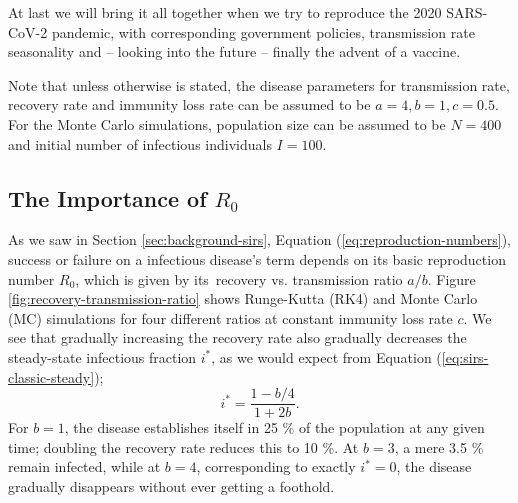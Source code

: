 \documentclass[]{article}
\begin{document}
At last we will bring it all together when we try to reproduce the 2020 SARS-CoV-2 pandemic, with corresponding government policies, transmission rate seasonality and -- looking into the future -- finally the advent of a vaccine.

Note that unless otherwise is stated, the disease parameters for transmission rate, recovery rate and immunity loss rate can be assumed to be $a=4, b=1, c=0.5$. For the Monte Carlo simulations, population size can be assumed to be $N=400$ and initial number of infectious individuals $I=100$.

\subsection{The Importance of $R_0$} \label{sec:recovery-rates}

As we saw in Section \ref{sec:background-sirs}, Equation (\ref{eq:reproduction-numbers}), success or failure on a infectious disease's term depends on its basic reproduction number $R_0$, which is given by its recovery vs. transmission ratio $a/b$. Figure \ref{fig:recovery-transmission-ratio} shows Runge-Kutta (RK4) and Monte Carlo (MC) simulations for four different ratios at constant immunity loss rate $c$. We see that gradually increasing the recovery rate also gradually decreases the steady-state infectious fraction $i^*$, as we would expect from Equation (\ref{eq:sirs-classic-steady});
\begin{equation}
	i^* = \frac{1 - b/4}{1 + 2b}.
\end{equation}
For $b = 1$, the disease establishes itself in 25 \% of the population at any given time; doubling the recovery rate reduces this to 10 \%. At $b = 3$, a mere 3.5 \% remain infected, while at $b = 4$, corresponding to exactly $i^* = 0$, the disease gradually disappears without ever getting a foothold.
\end{document}
